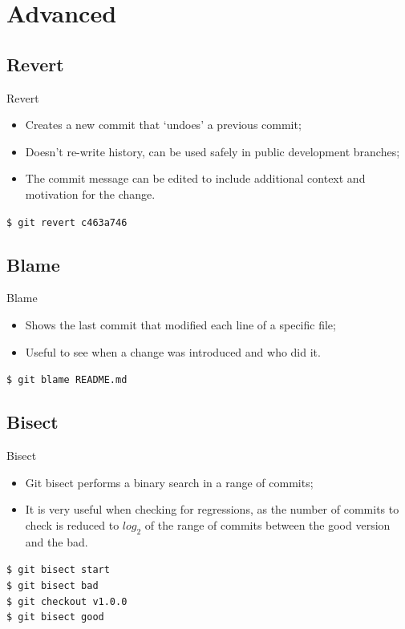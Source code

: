 \documentclass{beamer}
\begin{document}
\section{Advanced}

\subsection{Revert}
\begin{frame}{Revert}
  \begin{itemize}
    \item Creates a new commit that `undoes' a previous commit;
    \item Doesn't re-write history, can be used safely in public development branches;
    \item The commit message can be edited to include additional context and motivation for the change.
  \end{itemize}
  \begin{block}{}
    \texttt{\$ git revert c463a746}
  \end{block}
\end{frame}

\subsection{Blame}
\begin{frame}{Blame}
  \begin{itemize}
    \item Shows the last commit that modified each line of a specific file;
    \item Useful to see when a change was introduced and who did it.
  \end{itemize}
  \begin{block}{}
    \texttt{\$ git blame README.md}
  \end{block}
\end{frame}

\subsection{Bisect}
\begin{frame}{Bisect}
  \begin{itemize}
    \item Git bisect performs a binary search in a range of commits;
    \item It is very useful when checking for regressions, as the number of commits to check is reduced to $log_2$ of the range of commits between the good version and the bad.
  \end{itemize}
  \begin{block}{}
    \texttt{\$ git bisect start} \\
    \texttt{\$ git bisect bad} \\
    \texttt{\$ git checkout v1.0.0} \\
    \texttt{\$ git bisect good}
  \end{block}
\end{frame}
\end{document}
